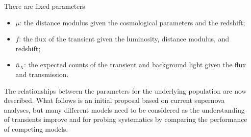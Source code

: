 \documentclass[preprint,3p]{elsarticle}
\begin{document}
There are  fixed parameters
\begin{itemize}
\item $\mu$: the distance modulus given the cosmological parameters and the redshift;
\item{$f$}: the flux of the transient given the luminosity, distance modulus, and
redshift;
\item{$\overline{n}_X$}: the expected counts of the transient and background light given
the flux and transmission.
\end{itemize}

The relationships between the parameters for the underlying population are now described.  What follows is an initial proposal
based on current supernova analyses, but many different models need to be
considered as the understanding of transients improve
and for probing systematics by comparing the
performance of competing models.
\end{document}
